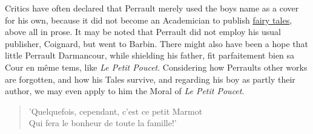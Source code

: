 \documentclass[14pt,a4paper]{memoir}
\newcommand{\ul}[1]{\uline{#1}}
\begin{document}
{Critics have often declared that Perrault merely used the
boy\textquotesingle s name as a cover for his own, because it did not
become an Academician to publish \ul{fairy tales}, above all in prose.
It may be noted that Perrault did not employ his usual publisher,
Coignard, but went to Barbin. There might also have been a hope that
little Perrault Darmancour, while shielding his father,
\textquotesingle fit parfaitement bien sa Cour en même
tems,\textquotesingle{} like \emph{Le Petit Poucet}. Considering how
Perrault\textquotesingle s other works are forgotten, and how his Tales
survive, and regarding his boy as partly their author, we may even apply
to him the Moral of \emph{Le Petit Poucet}.

\begin{verse}
  \small
'Quelquefois, cependant, c'est ce petit Marmot \\
Qui fera le bonheur de toute la famille!'
\end{verse}

}
\end{document}
